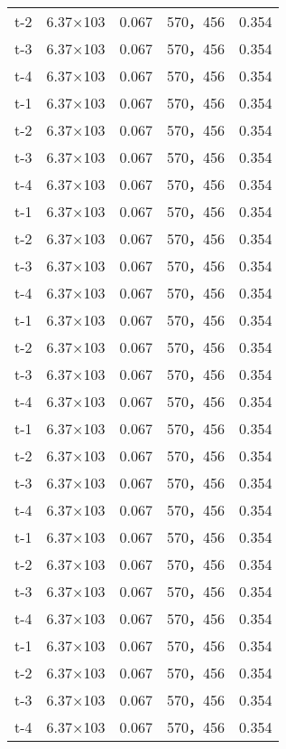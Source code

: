 \documentclass[../../main.tex]{subfiles}
\begin{document}
\begin{longtable}{ccccc}
t-2     &6.37×103       &0.067  &570，456        &0.354\\
t-3     &6.37×103       &0.067  &570，456        &0.354\\
t-4     &6.37×103       &0.067  &570，456        &0.354\\
t-1     &6.37×103       &0.067  &570，456        &0.354\\
t-2     &6.37×103       &0.067  &570，456        &0.354\\
t-3     &6.37×103       &0.067  &570，456        &0.354\\
t-4     &6.37×103       &0.067  &570，456        &0.354\\
t-1     &6.37×103       &0.067  &570，456        &0.354\\
t-2     &6.37×103       &0.067  &570，456        &0.354\\
t-3     &6.37×103       &0.067  &570，456        &0.354\\
t-4     &6.37×103       &0.067  &570，456        &0.354\\
t-1     &6.37×103       &0.067  &570，456        &0.354\\
t-2     &6.37×103       &0.067  &570，456        &0.354\\
t-3     &6.37×103       &0.067  &570，456        &0.354\\
t-4     &6.37×103       &0.067  &570，456        &0.354\\
t-1     &6.37×103       &0.067  &570，456        &0.354\\
t-2     &6.37×103       &0.067  &570，456        &0.354\\
t-3     &6.37×103       &0.067  &570，456        &0.354\\
t-4     &6.37×103       &0.067  &570，456        &0.354\\
t-1     &6.37×103       &0.067  &570，456        &0.354\\
t-2     &6.37×103       &0.067  &570，456        &0.354\\
t-3     &6.37×103       &0.067  &570，456        &0.354\\
t-4     &6.37×103       &0.067  &570，456        &0.354\\
t-1     &6.37×103       &0.067  &570，456        &0.354\\
t-2     &6.37×103       &0.067  &570，456        &0.354\\
t-3     &6.37×103       &0.067  &570，456        &0.354\\
t-4     &6.37×103       &0.067  &570，456        &0.354\\

\end{longtable}
\end{document}
